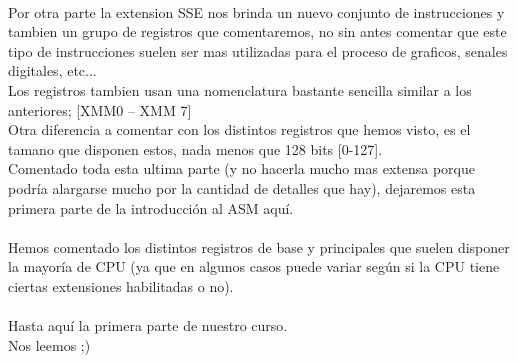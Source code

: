 \documentclass{fennix}
\begin{document}
\\
Por otra parte la extension SSE nos brinda un nuevo conjunto de instrucciones y tambien un grupo de registros que comentaremos, no sin antes comentar que este tipo de instrucciones suelen ser mas utilizadas para el proceso de graficos, senales digitales, etc...\\
Los registros tambien usan una nomenclatura bastante sencilla similar a los anteriores; [XMM0 – XMM 7]\\
Otra diferencia a comentar con los distintos registros que hemos visto, es el tamano que disponen estos, nada menos que 128 bits [0-127].\\
Comentado toda esta ultima parte (y no hacerla mucho mas extensa porque podría alargarse mucho por la cantidad de detalles que hay), dejaremos esta primera parte de la introducción al ASM aquí.\\
\\
Hemos comentado los distintos registros de base y principales que suelen disponer la mayoría de CPU (ya que en algunos casos puede variar según si la CPU tiene ciertas extensiones habilitadas o no).\\
\\
Hasta aquí la primera parte de nuestro curso.\\
Nos leemos ;)

\newpage
\end{document}
